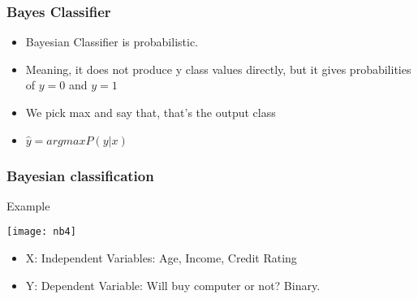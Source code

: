 \begin{frame}[fragile]\frametitle{Bayes Classifier}
	\begin{itemize}
	\item Bayesian Classifier is probabilistic.
	\item Meaning, it does not produce y class values directly,  but it gives probabilities of $y=0$ and $y=1$
	\item We pick max and say that, that's the output class
	\item $\hat{y} = arg max P (y|x)$
	\end{itemize}

\end{frame}




\begin{frame}[fragile]\frametitle{Bayesian classification }
Example
\begin{center}
\texttt{[image: nb4]}
\end{center}
\begin{itemize}
\item X: Independent Variables: Age, Income, Credit Rating
\item Y: Dependent Variable: Will buy computer or not? Binary.
\end{itemize}
\end{frame}



